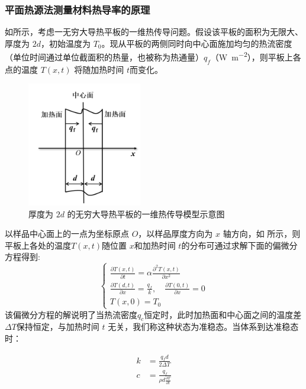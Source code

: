 \documentclass[a4paper,utf8]{article}
\begin{document}
        \subsubsection{平面热源法测量材料热导率的原理}
            如所示，考虑一无穷大导热平板的一维热传导问题。假设该平板的面积为无限大、厚度为 $2d$，初始温度为 $T_0$。现从平板的两侧同时向中心面施加均匀的热流密度（单位时间通过单位截面积的热量，也被称为热通量）$q_f$（\unit{\watt\per\meter\squared}），则平板上各点的温度 $T(x,t)$ 将随加热时间 $t$而变化。
            \begin{figure}[!ht]\centering
                \includegraphics[width=50mm]{fg2.png}
                \caption{厚度为 $2d$ 的无穷大导热平板的一维热传导模型示意图 \label{fg:2}}
            \end{figure}\par
            以样品中心面上的一点为坐标原点 $O$，以样品厚度方向为 $x$ 轴方向，如 所示，则平板上各处的温度$T(x,t)$随位置 $x$和加热时间 $t$的分布可通过求解下面的偏微分方程得到:
            \begin{equation}
                \begin{cases}
                    \frac{\partial T(x,t)}{\partial t}=\alpha\frac{\partial^2T(x,t)}{\partial x^2}\\
                    \frac{\partial T(d,t)}{\partial x}=\frac{q_f}k ,\quad\frac{\partial T(0,t)}{\partial x}=0\\
                    T(x,0)=T_0
                \end{cases}
            \end{equation}
            该偏微分方程的解说明了当热流密度$q_c$恒定时，此时加热面和中心面之间的温度差$\varDelta T$保持恒定，与加热时间 $t$ 无关，我们称这种状态为准稳态。当体系到达准稳态时：\par
            \begin{equation}
                \begin{aligned}
                    k&=\frac{q_fd}{2\Delta T}\\
                    c&=\frac{q_f}{\rho d\frac{\partial T}{\partial t}}
                \end{aligned}
            \end{equation}
\end{document}
